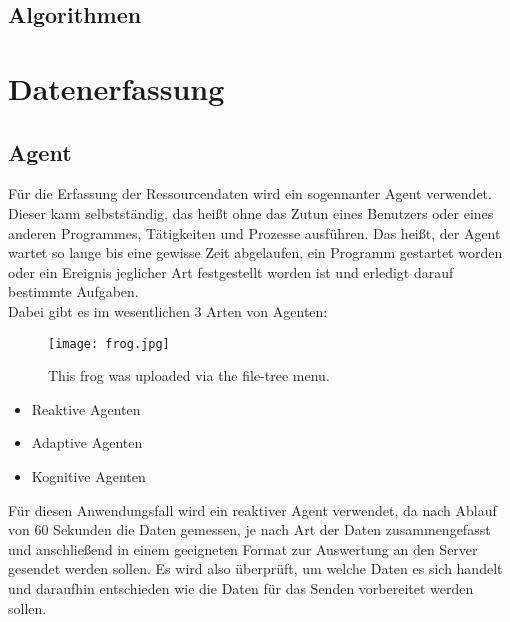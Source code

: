 \documentclass{report}
\begin{document}
\subsection{Algorithmen}

\section{Datenerfassung}
\subsection{Agent}
Für die Erfassung der Ressourcendaten wird ein sogennanter Agent verwendet. Dieser kann selbstständig, das heißt ohne das Zutun eines Benutzers oder eines anderen Programmes, Tätigkeiten und Prozesse ausführen. Das heißt, der Agent wartet so lange bis eine gewisse Zeit abgelaufen, ein Programm gestartet worden oder ein Ereignis jeglicher Art festgestellt worden ist und erledigt darauf bestimmte Aufgaben.\\
Dabei gibt es im wesentlichen 3 Arten von Agenten:
\begin{figure}
\centering
\texttt{[image: frog.jpg]}
\caption{\label{fig:frog}This frog was uploaded via the file-tree menu.}
\end{figure}

\begin{itemize}
    \item Reaktive Agenten
    \item Adaptive Agenten
    \item Kognitive Agenten
\end{itemize}
Für diesen Anwendungsfall wird ein reaktiver Agent verwendet, da nach Ablauf von 60 Sekunden die Daten gemessen, je nach Art der Daten zusammengefasst und anschließend in einem geeigneten Format zur Auswertung an den Server gesendet werden sollen. Es wird also überprüft, um welche Daten es sich handelt und daraufhin entschieden wie die Daten für das Senden vorbereitet werden sollen.
\end{document}
